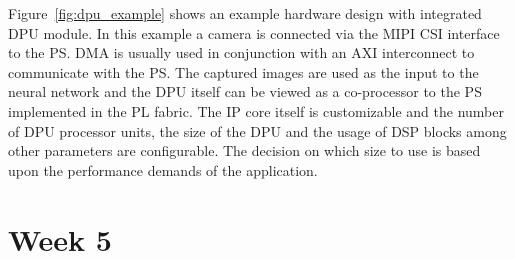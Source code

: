 Figure~\ref{fig:dpu_example} shows an example hardware design with integrated \ac{DPU} module. In this example a camera is connected via the \ac{MIPI} \ac{CSI} interface to the \ac{PS}. \ac{DMA} is usually used in conjunction with an \ac{AXI} interconnect to communicate with the \ac{PS}. The captured images are used as the input to the neural network and the \ac{DPU} itself can be viewed as a co-processor to the \ac{PS} implemented in the \ac{PL} fabric. The \ac{IP} core itself is customizable and the number of \ac{DPU} processor units, the size of the \ac{DPU} and the usage of \ac{DSP} blocks among other parameters are configurable. The decision on which size to use is based upon the performance demands of the application.

\section{Week 5}
